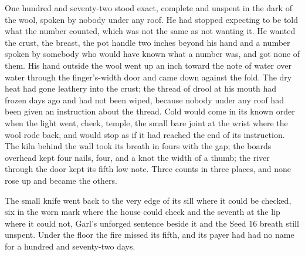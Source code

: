 One hundred and seventy-two stood exact, complete and unspent in the dark of the wool, spoken by nobody under any roof. He had stopped expecting to be told what the number counted, which was not the same as not wanting it. He wanted the crust, the breast, the pot handle two inches beyond his hand and a number spoken by somebody who would have known what a number was, and got none of them. His hand outside the wool went up an inch toward the note of water over water through the finger's-width door and came down against the fold. The dry heat had gone leathery into the crust; the thread of drool at his mouth had frozen days ago and had not been wiped, because nobody under any roof had been given an instruction about the thread. Cold would come in its known order when the light went, cheek, temple, the small bare joint at the wrist where the wool rode back, and would stop as if it had reached the end of its instruction. The kiln behind the wall took its breath in fours with the gap; the boards overhead kept four nails, four, and a knot the width of a thumb; the river through the door kept its fifth low note. Three counts in three places, and none rose up and became the others.

The small knife went back to the very edge of its sill where it could be checked, six in the worn mark where the house could check and the seventh at the lip where it could not, Garl's unforged sentence beside it and the Seed 16 breath still unspent. Under the floor the fire missed its fifth, and its payer had had no name for a hundred and seventy-two days.
